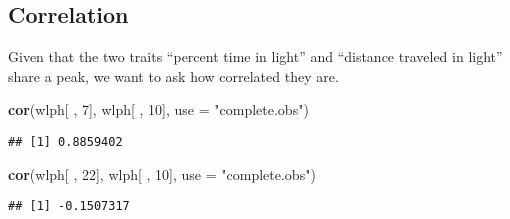 \documentclass[oneside]{book}
\newenvironment{Shaded}{\begin{snugshade}}{\end{snugshade}}
\newcommand{\DataTypeTok}[1]{\textcolor[rgb]{0.13,0.29,0.53}{#1}}
\newcommand{\DecValTok}[1]{\textcolor[rgb]{0.00,0.00,0.81}{#1}}
\newcommand{\KeywordTok}[1]{\textcolor[rgb]{0.13,0.29,0.53}{\textbf{#1}}}
\newcommand{\NormalTok}[1]{#1}
\newcommand{\OperatorTok}[1]{\textcolor[rgb]{0.81,0.36,0.00}{\textbf{#1}}}
\newcommand{\StringTok}[1]{\textcolor[rgb]{0.31,0.60,0.02}{#1}}
\begin{document}
\begin{Shaded}
\end{Shaded}

\hypertarget{correlation}{%
\subsection{Correlation}\label{correlation}}

Given that the two traits ``percent time in light'' and ``distance
traveled in light'' share a peak, we want to ask how correlated they
are.

\begin{Shaded}
\begin{Highlighting}[]
\KeywordTok{cor}\NormalTok{(wlph[ , }\DecValTok{7}\NormalTok{], wlph[ , }\DecValTok{10}\NormalTok{], }\DataTypeTok{use =} \StringTok{"complete.obs"}\NormalTok{)}
\end{Highlighting}
\end{Shaded}

\begin{verbatim}
## [1] 0.8859402
\end{verbatim}

\begin{Shaded}
\begin{Highlighting}[]
\KeywordTok{cor}\NormalTok{(wlph[ , }\DecValTok{22}\NormalTok{], wlph[ , }\DecValTok{10}\NormalTok{], }\DataTypeTok{use =} \StringTok{"complete.obs"}\NormalTok{)}
\end{Highlighting}
\end{Shaded}

\begin{verbatim}
## [1] -0.1507317
\end{verbatim}
\end{document}
